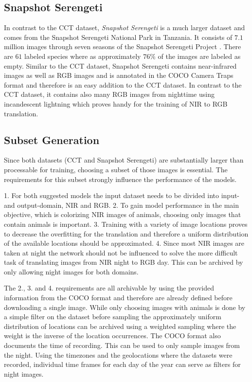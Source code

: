 \documentclass[a4paper,11pt, DIV=12]{scrartcl}
\begin{document}
\subsection{Snapshot Serengeti}
In contrast to the CCT dataset, \textit{Snapshot Serengeti} is a much larger dataset and comes from the Snapshot Serengeti National Park in Tanzania.
It consists of $7.1$ million images through seven seasons of the Snapshot Serengeti Project \cite{serengeti}.
There are $61$ labeled species where as approximately $76\%$ of the images are labeled as empty.
Similar to the CCT dataset, Snapshot Serengeti contains near-infrared images as well as RGB images and
is annotated in the COCO Camera Traps format \cite{serengeti} and therefore is an easy addition to the CCT dataset.
In contrast to the CCT dataset, it contains also many RGB images from nighttime using incandescent lightning which
proves handy for the training of NIR to RGB translation.

\subsection{Subset Generation}
Since both datasets (CCT and Snapshot Serengeti) are substantially larger than processable for training,
choosing a subset of those images is essential. The requirements for this subset strongly influence the performance
of the models.

1. For both suggested models the input dataset needs to be divided into input- and output-domain, NIR and RGB.
2. To gain model performance in the main objective, which is colorizing NIR images of animals,
choosing only images that contain animals is important.
3. Training with a variety of image locations proves to decrease the overfitting for the translation
and therefore a uniform distribution of the available locations should be approximated.
4. Since most NIR images are taken at night the network should not be influenced to solve the more difficult
task of translating images from NIR night to RGB day. This can be archived by only allowing night images for both
domains.

The 2., 3. and 4. requirements are all archivable by using the provided information from the COCO format and therefore
are already defined before downloading a single image.
While only choosing images with animals is done by a simple filter on the dataset before sampling the approximately uniform distribution
of locations can be archived using a weighted sampling where the weight is the inverse of the location occurrences.
The COCO format also documents the time of recording. This can be used to only sample images from the night.
Using the timezones and the geolocations where the datasets were recorded, individual time frames for each day of the year can serve as filters for night images.
\end{document}

